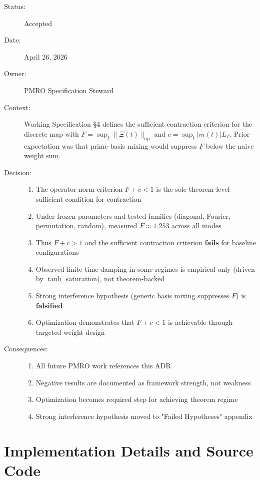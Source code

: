 \documentclass[11pt,a4paper]{article}
\begin{document}
\begin{description}
\item[Status:] Accepted
\item[Date:] April 26, 2026
\item[Owner:] PMRO Specification Steward
\item[Context:] Working Specification §4 defines the sufficient contraction criterion for the discrete map with \(F = \sup_t \|\Xi(t)\|_{\mathrm{op}}\) and \(c = \sup_t |m(t)|L_T\). Prior expectation was that prime-basis mixing would suppress \(F\) below the naive weight sum.

\item[Decision:]
\begin{enumerate}
\item The operator-norm criterion \(F+c<1\) is the sole theorem-level sufficient condition for contraction
\item Under frozen parameters and tested families (diagonal, Fourier, permutation, random), measured \(F \approx 1.253\) across all modes
\item Thus \(F+c>1\) and the sufficient contraction criterion \textbf{fails} for baseline configurations
\item Observed finite-time damping in some regimes is empirical-only (driven by \(\tanh\) saturation), not theorem-backed
\item Strong interference hypothesis (generic basis mixing suppresses \(F\)) is \textbf{falsified}
\item Optimization demonstrates that \(F+c<1\) is achievable through targeted weight design
\end{enumerate}

\item[Consequences:]
\begin{enumerate}
\item All future PMRO work references this ADR
\item Negative results are documented as framework strength, not weakness
\item Optimization becomes required step for achieving theorem regime
\item Strong interference hypothesis moved to "Failed Hypotheses" appendix
\end{enumerate}
\end{description}

\section{Implementation Details and Source Code}
\end{document}
